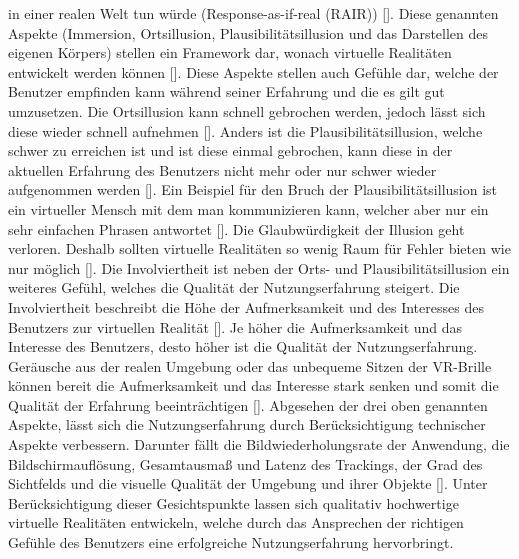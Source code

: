 \documentclass[a4paper,12pt,oneside]{article}
\begin{document}
        in einer realen Welt tun würde (\glqq Response-as-if-real\grqq{} (RAIR)) 
        [\cite{Slater2009}]. Diese genannten Aspekte (Immersion, Ortsillusion, 
        Plausibilitätsillusion und das Darstellen des eigenen Körpers) stellen ein 
        Framework dar, wonach virtuelle Realitäten entwickelt werden können 
        [\cite{Slater2009}]. Diese Aspekte stellen auch Gefühle dar, welche der Benutzer
        empfinden kann während seiner Erfahrung und die es gilt gut umzusetzen. Die 
        Ortsillusion kann schnell gebrochen werden, jedoch lässt sich diese wieder schnell
        aufnehmen [\cite{Slater2009}]. Anders ist die Plausibilitätsillusion, welche schwer
        zu erreichen ist und ist diese einmal gebrochen, kann diese in der aktuellen 
        Erfahrung des Benutzers nicht mehr oder nur schwer wieder aufgenommen werden 
        [\cite{Slater2009}].
        Ein Beispiel für den Bruch der Plausibilitätsillusion ist ein virtueller Mensch mit
        dem man kommunizieren kann, welcher aber nur ein sehr einfachen Phrasen antwortet
        [\cite[19]{Dorner2019}]. Die Glaubwürdigkeit der Illusion geht verloren. Deshalb 
        sollten virtuelle Realitäten so wenig Raum für Fehler bieten wie nur 
        möglich [\cite{Slater2009}].
        Die Involviertheit ist neben der Orts- und Plausibilitätsillusion ein weiteres
        Gefühl, welches die Qualität der Nutzungserfahrung steigert. Die Involviertheit
        beschreibt die Höhe der Aufmerksamkeit und des Interesses des Benutzers zur
        virtuellen Realität [\cite[227]{Witmer1998}]. Je höher die Aufmerksamkeit und das
        Interesse des Benutzers, desto höher ist die Qualität der Nutzungserfahrung.
        Geräusche aus der realen Umgebung oder das unbequeme Sitzen der VR-Brille können
        bereit die Aufmerksamkeit und das Interesse stark senken und somit die Qualität
        der Erfahrung beeinträchtigen [\cite[227]{Witmer1998}].
        Abgesehen der drei oben genannten Aspekte, lässt sich die Nutzungserfahrung durch
        Berücksichtigung technischer Aspekte verbessern. Darunter fällt die
        Bildwiederholungsrate der Anwendung, die Bildschirmauflösung, Gesamtausmaß und
        Latenz des Trackings, der Grad des Sichtfelds und die visuelle Qualität der Umgebung
        und ihrer Objekte [\cite{Slater2009}].
        Unter Berücksichtigung dieser Gesichtspunkte lassen sich qualitativ hochwertige
        virtuelle Realitäten entwickeln, welche durch das Ansprechen der richtigen Gefühle
        des Benutzers eine erfolgreiche Nutzungserfahrung hervorbringt.
\end{document}
